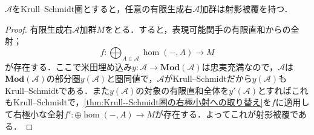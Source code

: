 \begin{thm}
	$\mathscr{A}$をKrull--Schmidt圏とすると，任意の有限生成右$\mathscr{A}$加群は射影被覆を持つ．
\end{thm}

\begin{proof}
	有限生成右$\mathscr{A}$加群$M$をとる．すると，表現可能関手の有限直和からの全射；
	\[f:\bigoplus_{A\in\mathscr{A}}\hom(-,A)\to M\]
	が存在する．ここで米田埋め込み$y:\mathscr{A}\to\mathbf{Mod}(\mathscr{A})$は忠実充満なので，$\mathscr{A}$は$\mathbf{Mod}(\mathscr{A})$の部分圏$y(\mathscr{A})$と圏同値で，$\mathscr{A}$がKrull--Schmidtだから$y(\mathscr{A})$もKrull--Schmidtである．また$y(\mathscr{A})$の対象の有限直和全体を$y'(\mathscr{A})$とすればこれもKrull--Schmidtで，\ref{thm:Krull--Schmidt圏の右極小射への取り替え}を$f$に適用して右極小な全射$f':\oplus\hom(-,A)\to M$が存在する．よってこれが射影被覆である．
\end{proof}
%
%
%
%
%
%
